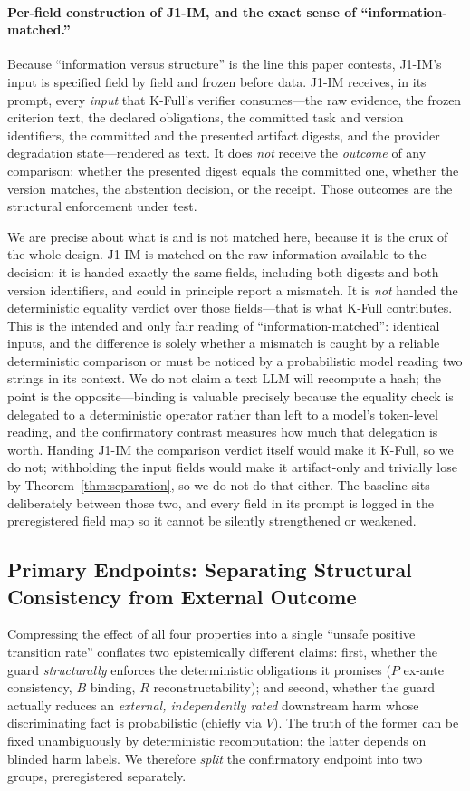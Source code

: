 \documentclass[sigconf,anonymous,review]{acmart}
\begin{document}
\paragraph{Per-field construction of J1-IM, and the exact sense of ``information-matched.''} Because ``information versus structure'' is the line this paper contests, J1-IM's input is specified field by field and frozen before data. J1-IM receives, in its prompt, every \emph{input} that K-Full's verifier consumes---the raw evidence, the frozen criterion text, the declared obligations, the committed task and version identifiers, the committed and the presented artifact digests, and the provider degradation state---rendered as text. It does \emph{not} receive the \emph{outcome} of any comparison: whether the presented digest equals the committed one, whether the version matches, the abstention decision, or the receipt. Those outcomes are the structural enforcement under test.

We are precise about what is and is not matched here, because it is the crux of the whole design. J1-IM is matched on the raw information available to the decision: it is handed exactly the same fields, including both digests and both version identifiers, and could in principle report a mismatch. It is \emph{not} handed the deterministic equality verdict over those fields---that is what K-Full contributes. This is the intended and only fair reading of ``information-matched'': identical inputs, and the difference is solely whether a mismatch is caught by a reliable deterministic comparison or must be noticed by a probabilistic model reading two strings in its context. We do not claim a text LLM will recompute a hash; the point is the opposite---binding is valuable precisely because the equality check is delegated to a deterministic operator rather than left to a model's token-level reading, and the confirmatory contrast measures how much that delegation is worth. Handing J1-IM the comparison verdict itself would make it K-Full, so we do not; withholding the input fields would make it artifact-only and trivially lose by Theorem~\ref{thm:separation}, so we do not do that either. The baseline sits deliberately between those two, and every field in its prompt is logged in the preregistered field map so it cannot be silently strengthened or weakened.

\subsection{Primary Endpoints: Separating Structural Consistency from External Outcome}
Compressing the effect of all four properties into a single ``unsafe positive transition rate'' conflates two epistemically different claims: first, whether the guard \emph{structurally} enforces the deterministic obligations it promises ($P$ ex-ante consistency, $B$ binding, $R$ reconstructability); and second, whether the guard actually reduces an \emph{external, independently rated} downstream harm whose discriminating fact is probabilistic (chiefly via $V$). The truth of the former can be fixed unambiguously by deterministic recomputation; the latter depends on blinded harm labels. We therefore \emph{split} the confirmatory endpoint into two groups, preregistered separately.
\end{document}
